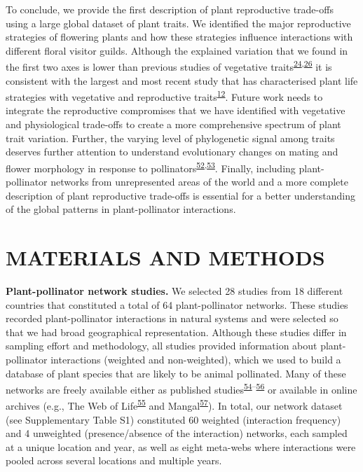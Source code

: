 \documentclass[
  12pt,
  a4paper,
]{article}
\begin{document}
To conclude, we provide the first description of plant reproductive trade-offs using a large global dataset of plant traits. We identified the major reproductive strategies of flowering plants and how these strategies influence interactions with different floral visitor guilds. Although the explained variation that we found in the first two axes is lower than previous studies of vegetative traits\textsuperscript{\protect\hyperlink{ref-diaz2016}{24},\protect\hyperlink{ref-carmona2021}{26}} it is consistent with the largest and most recent study that has characterised plant life strategies with vegetative and reproductive traits\textsuperscript{\protect\hyperlink{ref-salguero2016}{12}}. Future work needs to integrate the reproductive compromises that we have identified with vegetative and physiological trade-offs to create a more comprehensive spectrum of plant trait variation. Further, the varying level of phylogenetic signal among traits deserves further attention to understand evolutionary changes on mating and flower morphology in response to pollinators\textsuperscript{\protect\hyperlink{ref-gervasi2017}{52},\protect\hyperlink{ref-mackin2021}{53}}. Finally, including plant-pollinator networks from unrepresented areas of the world and a more complete description of plant reproductive trade-offs is essential for a better understanding of the global patterns in plant-pollinator interactions.

\hypertarget{materials-and-methods}{%
\section{MATERIALS AND METHODS}\label{materials-and-methods}}

\textbf{Plant-pollinator network studies.} We selected 28 studies from 18 different countries that constituted a total of 64 plant-pollinator networks. These studies recorded plant-pollinator interactions in natural systems and were selected so that we had broad geographical representation. Although these studies differ in sampling effort and methodology, all studies provided information about plant-pollinator interactions (weighted and non-weighted), which we used to build a database of plant species that are likely to be animal pollinated. Many of these networks are freely available either as published studies\textsuperscript{\protect\hyperlink{ref-olesen2007}{54}--\protect\hyperlink{ref-carvalheiro2014}{56}} or available in online archives (e.g., The Web of Life\textsuperscript{\protect\hyperlink{ref-fortuna2010}{55}} and Mangal\textsuperscript{\protect\hyperlink{ref-poisot2016}{57}}). In total, our network dataset (see Supplementary Table S1) constituted 60 weighted (interaction frequency) and 4 unweighted (presence/absence of the interaction) networks, each sampled at a unique location and year, as well as eight meta-webs where interactions were pooled across several locations and multiple years.
\end{document}
